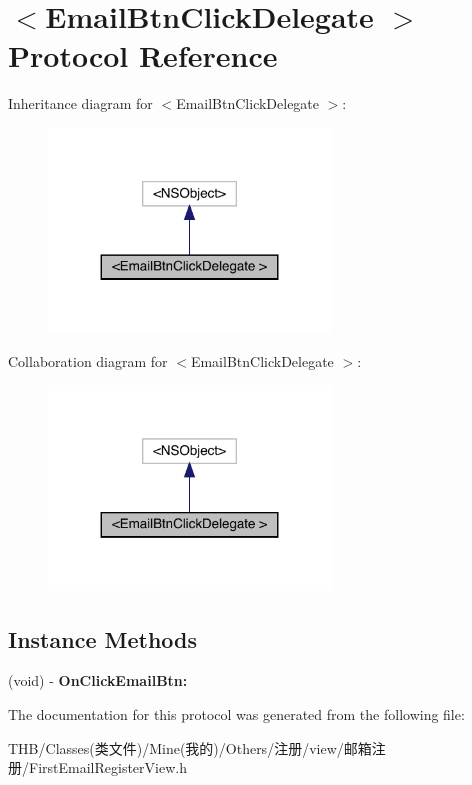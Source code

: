 \hypertarget{protocol_email_btn_click_delegate_01-p}{}\section{$<$Email\+Btn\+Click\+Delegate $>$ Protocol Reference}
\label{protocol_email_btn_click_delegate_01-p}


Inheritance diagram for $<$Email\+Btn\+Click\+Delegate $>$\+:\nopagebreak
\begin{figure}[H]
\begin{center}
\leavevmode
\includegraphics[width=212pt]{protocol_email_btn_click_delegate_01-p__inherit__graph}
\end{center}
\end{figure}


Collaboration diagram for $<$Email\+Btn\+Click\+Delegate $>$\+:\nopagebreak
\begin{figure}[H]
\begin{center}
\leavevmode
\includegraphics[width=212pt]{protocol_email_btn_click_delegate_01-p__coll__graph}
\end{center}
\end{figure}
\subsection*{Instance Methods}
\begin{DoxyCompactItemize}
\item 
\mbox{\label{protocol_email_btn_click_delegate_01-p_ab57fd2c52ea990be5f9ebab9ecd7ef8f}} 
(void) -\/ {\bfseries On\+Click\+Email\+Btn\+:}
\end{DoxyCompactItemize}


The documentation for this protocol was generated from the following file\+:\begin{DoxyCompactItemize}
\item 
T\+H\+B/\+Classes(类文件)/\+Mine(我的)/\+Others/注册/view/邮箱注册/First\+Email\+Register\+View.\+h\end{DoxyCompactItemize}
